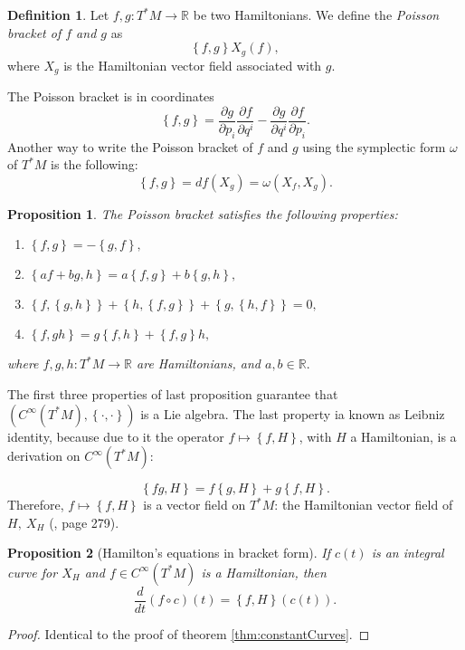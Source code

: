 \documentclass[12pt, letterpaper, reqno]{amsart}
\theoremstyle{definition}
\newtheorem{df}{Definition}
\theoremstyle{plain}
\newtheorem{prop}{Proposition}
\theoremstyle{remark}
\begin{document}
\begin{df}
	Let $ f,g: T^*M \rightarrow \mathbb{R} $ be two Hamiltonians. We define the \textit{Poisson bracket of $ f $ and $ g $ } as 
	$$ \left\{ f,g \right\} X_g(f),$$ 
	where $ X_g  $ is the Hamiltonian vector field associated with $ g. $ 
\end{df}
The Poisson bracket is in coordinates
$$ \left\{ f,g \right\} = \frac{\partial g}{\partial p_i}\frac{\partial f}{\partial q^i} - \frac{\partial g}{\partial q^i} \frac{\partial f}{\partial p_i}.   $$ 
Another way to write the Poisson bracket of $ f $ and $ g $ using the symplectic form $ \omega $ of $ T^*M $ is the following:
$$ \left\{ f,g \right\} = df(X_g)=\omega (X_f,X_g). $$ 
\begin{prop}
	The Poisson bracket satisfies the following properties:
	\begin{enumerate}
		\item $ \left\{ f,g \right\} = -\left\{ g,f \right\},$ 
		\item $ \left\{ af+bg,h \right\} = a\left\{ f,g \right\}+ b \left\{ g,h \right\} ,   $ 
		\item $ \left\{ f, \left\{ g,h \right\}  \right\} +\left\{ h, \left\{ f,g \right\}  \right\} + \left\{ g, \left\{ h,f \right\}  \right\} =0, $  
		\item $ \left\{ f,gh \right\} =g \left\{ f,h \right\} + \left\{ f,g \right\} h,$ 
	\end{enumerate}
	where $ f,g,h: T^*M \rightarrow \mathbb{R} $ are Hamiltonians, and $ a,b\in \mathbb{R}. $ 
\end{prop}
The first three properties of last proposition guarantee that $ \left( C^\infty(T^*M), \left\{ \cdot,\cdot \right\}  \right) $ is a Lie algebra. The last property ia known as Leibniz identity, because due to it the operator $ f\mapsto \left\{ f,H \right\}  $, with $ H $ a Hamiltonian, is a derivation on $ C^\infty(T^*M): $ 

$$ \left\{ fg,H \right\} =f \left\{ g,H \right\} +g \left\{ f,H \right\} . $$ 
Therefore, $ f\mapsto \left\{ f,H \right\}  $ is a vector field on $T^*M$: the Hamiltonian vector field of $ H, \ X_H $ (\cite{montgomery2002tour}, page 279).

\begin{prop}[Hamilton's equations in bracket form]
	If $ c(t) $ is an integral curve for $ X_H $ and $ f\in C^\infty(T^*M) $ is a Hamiltonian, then
	\begin{equation}\label{eq:HamEq}
		\frac{d}{dt} \left( f\circ c \right)(t) = \left\{ f,H \right\} (c(t)).
	\end{equation}
\end{prop}
\begin{proof}
	Identical to the proof of theorem \ref{thm:constantCurves}.
\end{proof}
\end{document}
